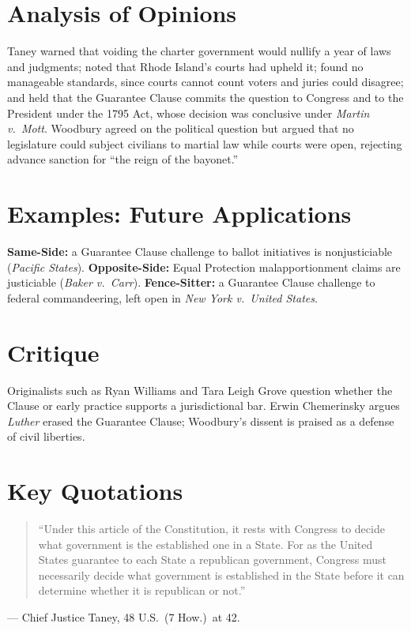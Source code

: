 \documentclass[12pt]{article}
\begin{document}
\section{Analysis of Opinions}
Taney warned that voiding the charter government would nullify a year of laws and judgments; noted that Rhode Island's courts had upheld it; found no manageable standards, since courts cannot count voters and juries could disagree; and held that the Guarantee Clause commits the question to Congress and to the President under the 1795 Act, whose decision was conclusive under \textit{Martin v.\ Mott}. Woodbury agreed on the political question but argued that no legislature could subject civilians to martial law while courts were open, rejecting advance sanction for ``the reign of the bayonet.''

\section{Examples: Future Applications}
\textbf{Same-Side:} a Guarantee Clause challenge to ballot initiatives is nonjusticiable (\textit{Pacific States}). \textbf{Opposite-Side:} Equal Protection malapportionment claims are justiciable (\textit{Baker v.\ Carr}). \textbf{Fence-Sitter:} a Guarantee Clause challenge to federal commandeering, left open in \textit{New York v.\ United States}.

\section{Critique}
Originalists such as Ryan Williams and Tara Leigh Grove question whether the Clause or early practice supports a jurisdictional bar. Erwin Chemerinsky argues \textit{Luther} erased the Guarantee Clause; Woodbury's dissent is praised as a defense of civil liberties.

\section{Key Quotations}
\begin{quote}
``Under this article of the Constitution, it rests with Congress to decide what government is the established one in a State. For as the United States guarantee to each State a republican government, Congress must necessarily decide what government is established in the State before it can determine whether it is republican or not.''
\end{quote}
\noindent --- Chief Justice Taney, 48 U.S.\ (7 How.)\ at 42.
\end{document}
